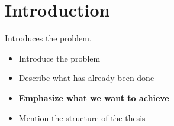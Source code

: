\chapter*{Introduction}

Introduces the problem.

\begin{itemize}
\item Introduce the problem
\item Describe what has already been done
\item {\bf Emphasize what we want to achieve}
\item Mention the structure of the thesis
\end{itemize}